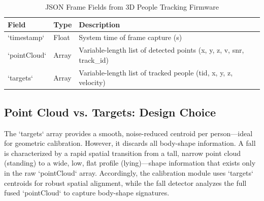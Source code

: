 \begin{table}[H]
\caption{JSON Frame Fields from 3D People Tracking Firmware}
\label{tab:summary_2}
\centering
\begin{tabularx}{\textwidth}{@{} l X X @{}}
\toprule
\textbf{\textbf{Field}} & \textbf{\textbf{Type}} & \textbf{\textbf{Description}} \\ \midrule
`timestamp` & Float & System time of frame capture (s) \\
`pointCloud` & Array & Variable-length list of detected points (x, y, z, v, snr, track\_id) \\
`targets` & Array & Variable-length list of tracked people (tid, x, y, z, velocity) \\ \bottomrule
\end{tabularx}
\end{table}




\subsection{Point Cloud vs. Targets: Design Choice}

The `targets` array provides a smooth, noise-reduced centroid per person---ideal for geometric calibration. However, it discards all body-shape information. A fall is characterized by a rapid spatial transition from a tall, narrow point cloud (standing) to a wide, low, flat profile (lying)---shape information that exists only in the raw `pointCloud` array. Accordingly, the calibration module uses `targets` centroids for robust spatial alignment, while the fall detector analyzes the full fused `pointCloud` to capture body-shape signatures. 


